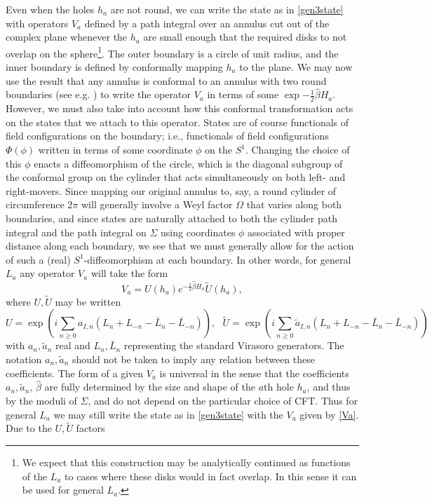 \documentclass[12pt]{article}
\numberwithin{equation}{section}
\begin{document}
Even when the holes $h_a$ are not round, we can write the state as in \eqref{gen3state} with operators $V_a$ defined by a path integral over an annulus cut out of the complex plane whenever the $h_a$ are small enough that the required disks to not overlap on the sphere\footnote{We expect that this construction may be analytically continued as functions of the $L_a$ to cases where these disks would in fact overlap.  In this sense it can be used for general $L_a$.}. The outer boundary is a circle of unit radius, and the inner boundary is defined by conformally mapping $h_a$ to the plane.  We may now use the result that any annulus is conformal to an annulus with two round boundaries (see e.g. \cite{seppala11}) to write the operator $V_a$ in terms of some $\exp{-\frac{1}{2} \hat \beta H_a}$.  However, we must also take into account how this conformal transformation acts on the states that we attach to this operator.  States are of course functionals of field configurations on the boundary; i.e., functionals of field configurations $\Phi(\phi)$ written in terms of some coordinate $\phi$ on the $S^1$.  Changing the choice of this $\phi$ enacts a diffeomorphism of the circle, which is the diagonal subgroup of the conformal group on the cylinder that acts simultaneously on both left- and right-movers.  Since mapping our original annulus to, say, a round cylinder of circumference $2\pi$ will generally involve a Weyl factor $\Omega$ that varies along both boundaries, and since states are naturally attached to both the cylinder path integral and the path integral on $\Sigma$ using coordinates $\phi$ associated with proper distance along each boundary, we see that we must generally allow for the action of such a (real) $S^1$-diffeomorphism at each boundary.  In other words, for general $L_a$ any operator $V_a$ will take the form
\begin{equation}
\label{Va}
V_a = U(h_a) e^{-\frac{1}{2} \hat \beta H_a} \tilde U(h_a),
\end{equation}
where $U,\tilde U$ may be written
\begin{equation}
\label{UI}
U = \exp \left( i \sum_{n \ge 0}  a_{I,n} \left(L_n + L_{-n} - \bar L_n - \bar L_{-n} \right) \right),  \ \ \
\tilde U = \exp \left( i \sum_{n \ge 0}  \tilde a_{I,n} \left(L_n + L_{-n} - \bar L_n - \bar L_{-n} \right) \right)
\end{equation}
with $a_n, \tilde a_n$ real and $L_n, \bar L_n$ representing the standard Virasoro generators.  The notation $a_n, \tilde a_n$ should not be taken to imply any relation between these coefficients.  The form of a given $V_a$ is universal in the sense that the coefficients $a_n, \tilde a_n$, $\hat \beta$ are fully determined by the size and shape of the $a$th hole $h_a$, and thus by the moduli of $\Sigma$, and do not depend on the particular choice of CFT. Thus for general $L_a$ we may still write the state as in \eqref{gen3state} with the $V_a$ given by \eqref{Va}. Due to the $U, \tilde U$ factors
\end{document}
